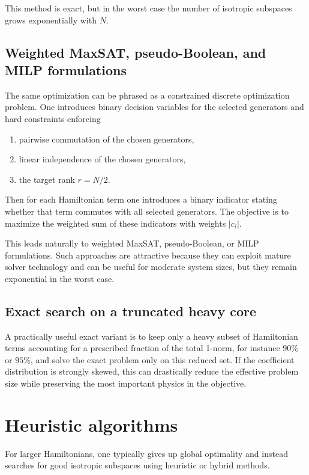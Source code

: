 \documentclass[11pt]{article}
\begin{document}
This method is exact, but in the worst case the number of isotropic subspaces grows exponentially with $N$.

\subsection{Weighted MaxSAT, pseudo-Boolean, and MILP formulations}
The same optimization can be phrased as a constrained discrete optimization problem.
One introduces binary decision variables for the selected generators and hard constraints enforcing
\begin{enumerate}[label=\arabic*.]
  \item pairwise commutation of the chosen generators,
  \item linear independence of the chosen generators,
  \item the target rank $r=N/2$.
\end{enumerate}
Then for each Hamiltonian term one introduces a binary indicator stating whether that term commutes with all selected generators. The objective is to maximize the weighted sum of these indicators with weights $|c_i|$.

This leads naturally to weighted MaxSAT, pseudo-Boolean, or MILP formulations. Such approaches are attractive because they can exploit mature solver technology and can be useful for moderate system sizes, but they remain exponential in the worst case.

\subsection{Exact search on a truncated heavy core}
A practically useful exact variant is to keep only a heavy subset of Hamiltonian terms accounting for a prescribed fraction of the total 1-norm, for instance $90\%$ or $95\%$, and solve the exact problem only on this reduced set. If the coefficient distribution is strongly skewed, this can drastically reduce the effective problem size while preserving the most important physics in the objective.

\section{Heuristic algorithms}
For larger Hamiltonians, one typically gives up global optimality and instead searches for good isotropic subspaces using heuristic or hybrid methods.
\end{document}
